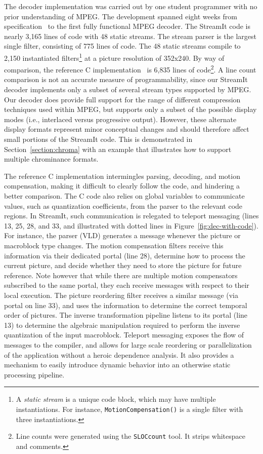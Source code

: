 The decoder implementation was carried out by one student programmer
with no prior understanding of MPEG. The development spanned eight
weeks from specification~\cite{MPEG2} to the first fully functional
MPEG decoder. The StreamIt code is nearly 3,165 lines of code with 48
static streams. The stream parser is the largest single filter,
consisting of 775 lines of code. The 48 static streams compile to
2,150 instantiated filters\footnote{A  {\it static stream} is a unique
code block, which may have multiple instantiations. For instance,
\texttt{MotionCompensation()} is a single filter with three
instantiations.} at a picture resolution of 352x240. By way of
comparison, the reference C implementation~\cite{reference-mpeg-c} is
6,835 lines of code\footnote{Line counts were generated using  the
\texttt{SLOCcount} tool. It strips whitespace and comments.}.  A line
count comparison is not an accurate measure of programmability, since
our StreamIt decoder implements only a subset of several stream types
supported by MPEG.  Our decoder does provide full support for the
range of different compression techniques used within MPEG, but
supports only a subset of the possible display modes (i.e., interlaced
versus progressive output).  However, these alternate display formats
represent minor conceptual changes and should therefore affect small
portions of the StreamIt code. This is demonstrated in
Section~\ref{section:chroma} with an example that illustrates how to
support multiple chrominance formats.

The reference C implementation intermingles parsing, decoding, and
motion compensation, making it difficult to clearly follow the code,
and hindering a better comparison. The C code also relies on global
variables to communicate values, such as quantization coefficients,
from the parser to the relevant code regions. In StreamIt, such
communication is relegated to teleport messaging (lines 13, 25, 28, and
33, and illustrated with dotted lines in
Figure~\ref{fig:dec-with-code}). For instance, the parser (VLD)
generates a message whenever the picture or macroblock type
changes. The motion compensation filters receive this information via
their dedicated portal (line 28), determine how to process the current
picture, and decide whether they need to store the picture for future
reference. Note however that while there are multiple motion compensators
subscribed to the same portal, they each receive messages with
respect to their local execution.
The picture reordering filter receives a similar message
(via portal on line 33), and uses the information to determine the
correct temporal order of pictures. The inverse transformation
pipeline listens to its portal (line 13) to determine the algebraic
manipulation required to perform the inverse quantization of the input
macroblock. Teleport messaging 
exposes the flow of messages to the compiler, and allows for large
scale reordering or parallelization of the application without a
heroic dependence analysis. It also provides a mechanism to easily
introduce dynamic behavior into an otherwise static processing pipeline.

